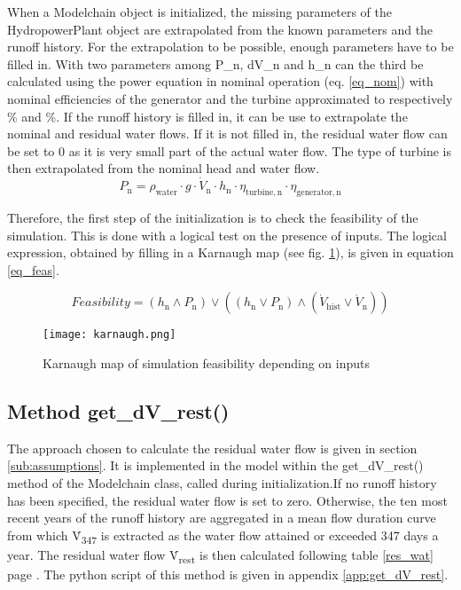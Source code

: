 When a Modelchain object is initialized, the missing parameters of the HydropowerPlant object are extrapolated from the known parameters and the runoff history. For the extrapolation to be possible, enough parameters have to be filled in. With two parameters among  P{\_}n, dV{\_}n and h{\_}n can the third be calculated using the power equation in nominal operation (eq. \ref{eq_nom}) with nominal efficiencies of the generator and the turbine approximated to respectively \unit[95]{\%} and \unit[90]{\%}. If the runoff history is filled in, it can be use to extrapolate the nominal and residual water flows. If it is not filled in, the residual water flow can be set to 0 as it is very small part of the actual water flow. The type of turbine is then extrapolated from the nominal head and water flow.
\begin{equation}
\label{eq_nom} 
 P_\mathrm{n} = \rho_\mathrm{water} \cdot g \cdot \dot{V}_\mathrm{n} \cdot h_\mathrm{n} \cdot \eta_\mathrm{turbine, n} \cdot \eta_\mathrm{generator, n}
\end{equation}

Therefore, the first step of the initialization is to check the feasibility of the simulation. This is done with a logical test on the presence of inputs. The logical expression, obtained by filling in a Karnaugh map (see fig. \ref{karnaugh}), is given in equation \ref{eq_feas}.

\begin{equation}
\label{eq_feas} 
 Feasibility = (h_\mathrm{n} \land P_\mathrm{n}) \lor ((h_\mathrm{n} \lor P_\mathrm{n}) \land (\dot{V}_\mathrm{hist} \lor \dot{V}_\mathrm{n}))
\end{equation}

\begin{figure}[H]
\centering
\texttt{[image: karnaugh.png]}
\caption{Karnaugh map of simulation feasibility depending on inputs}
\label{karnaugh}
\end{figure}

\subsection{Method get{\_}dV{\_}rest()}

The approach chosen to calculate the residual water flow is given in section \ref{sub:assumptions}. It is implemented in the model within the get{\_}dV{\_}rest() method of the Modelchain class, called during initialization.\newline If no runoff history has been specified, the residual water flow is set to zero. Otherwise, the ten most recent years of the runoff history are aggregated in a mean flow duration curve from which \.{V}\textsubscript{347} is extracted as the water flow attained or exceeded 347 days a year. The residual water flow \.{V}\textsubscript{rest} is then calculated following table \ref{res_wat} page \pageref{res_wat}. \newline
The python script of this method is given in appendix \ref{app:get_dV_rest}.

